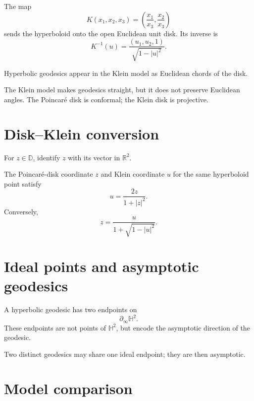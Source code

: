 \begin{theorem}\label{thm:vii31-klein-map}
The map
\[
K(x_1,x_2,x_3)
=
\left(\frac{x_1}{x_3},\frac{x_2}{x_3}\right)
\]
sends the hyperboloid onto the open Euclidean unit disk.
Its inverse is
\[
K^{-1}(u)
=
\frac{(u_1,u_2,1)}{\sqrt{1-|u|^2}}.
\]
\end{theorem}

\begin{proposition}\label{prop:vii31-klein-geodesics}
Hyperbolic geodesics appear in the Klein model as Euclidean chords of the disk.
\end{proposition}

\begin{warning}\label{warn:vii31-klein}
The Klein model makes geodesics straight, but it does not preserve Euclidean
angles.  The Poincaré disk is conformal; the Klein disk is projective.
\end{warning}

\section{Disk--Klein conversion}

For \(z\in\mathbb D\), identify \(z\) with its vector in \(\mathbb R^2\).

\begin{proposition}\label{prop:vii31-disk-klein}
The Poincaré-disk coordinate \(z\) and Klein coordinate \(u\) for the same
hyperboloid point satisfy
\[
u=\frac{2z}{1+|z|^2}.
\]
Conversely,
\[
z
=
\frac{u}{1+\sqrt{1-|u|^2}}.
\]
\end{proposition}

\section{Ideal points and asymptotic geodesics}

\begin{definition}\label{def:vii31-ideal-endpoint}
A hyperbolic geodesic has two endpoints on
\[
\partial_\infty\mathbb H^2.
\]
These endpoints are not points of \(\mathbb H^2\), but encode the asymptotic
direction of the geodesic.
\end{definition}

Two distinct geodesics may share one ideal endpoint; they are then asymptotic.

\section{Model comparison}

